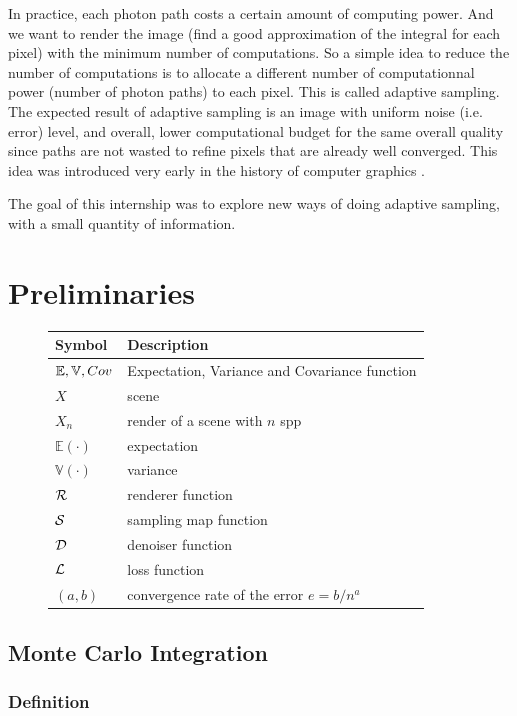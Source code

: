 \documentclass{classeENS}
\begin{document}
\par In practice, each photon path costs a certain amount of computing power. 
And we want to render the image (find a good approximation of the integral 
for each pixel) with the minimum number of computations. So a simple idea 
to reduce the number of computations is to allocate a different number 
of computationnal power (number of photon paths) to each pixel. This is called 
adaptive sampling. The expected result of adaptive sampling is an 
image with uniform noise (i.e. error) level, and overall, 
lower computational budget for the same overall quality 
since paths are not wasted to refine pixels that are 
already well converged. This idea was introduced very early in the 
history of computer graphics \cite{10.1145/325165.325179}.

\par The goal of this internship was to explore new ways of doing adaptive 
sampling, with a small quantity of information.
\section{Preliminaries}

\begin{figure}[H]
    \centering
    \begin{tabular}{C{2cm} L{10cm}}
    \hline  
        Symbol & Description
    \tabularnewline 
    \hline
        $\mathbb E, \mathbb V, Cov$ & Expectation, Variance and Covariance function
    \tabularnewline
        $X$ & scene
    \tabularnewline
        $X_n$ & render of a scene with $n$ spp
    \tabularnewline
        $\mathbb E(\cdot)$ & expectation
    \tabularnewline
        $\mathbb V(\cdot)$ & variance
    \tabularnewline
        $\mathcal R$ & renderer function
    \tabularnewline
        $\mathcal S$ & sampling map function
    \tabularnewline
        $\mathcal D$ & denoiser function
    \tabularnewline
        $\mathcal L$ & loss function
    \tabularnewline
        $(a,b)$ & convergence rate of the error $e = b/n^a$
    \tabularnewline
    \hline 
    \end{tabular}
\end{figure}

\subsection{Monte Carlo Integration}

\subsubsection{Definition}\label{montecarlo}
\end{document}
